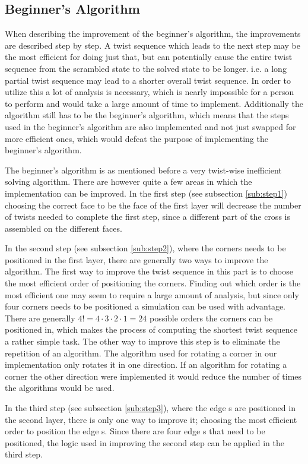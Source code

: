 \subsection{Beginner's Algorithm}
When describing the improvement of the beginner's algorithm, the improvements are described step by step. 
A twist sequence which leads to the next step may be the most efficient for doing just that, but can potentially cause the entire twist sequence from the scrambled state to the solved state to be longer. 
i.e. a long partial twist sequence may lead to a shorter overall twist sequence. In order to utilize this a lot of analysis is necessary, which is nearly impossible for a person to perform and would take a large amount of time to implement.
Additionally the algorithm still has to be the beginner's algorithm, which means that the steps used in the beginner's algorithm are also implemented and not just swapped for more efficient ones, which would defeat the purpose of implementing the beginner's algorithm.


The beginner's algorithm is as mentioned before a very twist-wise inefficient solving algorithm. 
There are however quite a few areas in which the implementation can be improved.
In the first step (see subsection \ref{sub:step1}) choosing the correct face to be the face of the first layer will decrease the number of twists needed to complete the first step, since a different part of the cross is assembled on the different faces.

In the second step (see subsection \ref{sub:step2}), where the corners needs to be positioned in the first layer, there are generally two ways to improve the algorithm.
The first way to improve the twist sequence in this part is to choose the most efficient order of positioning the corners.
Finding out which order is the most efficient one may seem to require a large amount of analysis, but since only four corners needs to be positioned a simulation can be used with advantage.
There are generally $4! = 4 \cdot 3 \cdot 2 \cdot 1 = 24$ possible orders the corners can be positioned in, which makes the process of computing the shortest twist sequence a rather simple task.
The other way to improve this step is to eliminate the repetition of an algorithm. 
The algorithm used for rotating a corner \cpiece{} in our implementation only rotates it in one direction. 
If an algorithm for rotating a corner \cpiece{} the other direction were implemented it would reduce the number of times the algorithms would be used.

In the third step (see subsection \ref{sub:step3}), where the edge \cpiece{}s are positioned in the second layer, there is only one way to improve it; choosing the most efficient order to position the edge \cpiece{}s. Since there are four edge \cpiece{}s that need to be positioned, the logic used in improving the second step can be applied in the third step.

